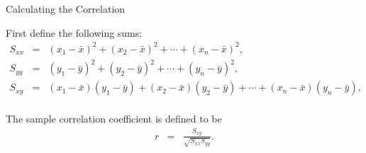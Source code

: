 \begin{frame}{Calculating the Correlation}

  First define the following sums:
  \begin{eqnarray*}
    S_{xx} & = & (x_1-\bar{x})^2 + (x_2-\bar{x})^2 + \cdots + (x_n-\bar{x})^2, \\
    S_{yy} & = & (y_1-\bar{y})^2 + (y_2-\bar{y})^2 + \cdots + (y_n-\bar{y})^2, \\
    S_{xy} & = & (x_1-\bar{x})(y_1-\bar{y}) + (x_2-\bar{x})(y_2-\bar{y}) + \cdots + (x_n-\bar{x})(y_n-\bar{y}), \\
  \end{eqnarray*}

  {
    
    \begin{definition}
      The sample correlation coefficient is defined to be
      \begin{eqnarray*}
        r & = & \frac{S_{xy}}{\sqrt{S_{xx} S_{yy}}}.
      \end{eqnarray*}
    \end{definition}

  }
  
\end{frame}


